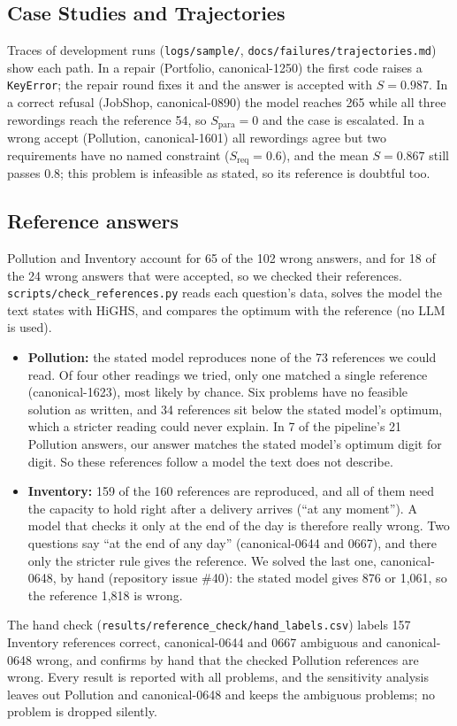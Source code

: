 \documentclass[conference]{IEEEtran}
\begin{document}
\subsection{Case Studies and Trajectories}
\label{sec:case_studies}
Traces of development runs (\texttt{logs/sample/}, \texttt{docs/failures/trajectories.md}) show each path. In a
repair (Portfolio, canonical-1250) the first code raises a \texttt{KeyError}; the repair round fixes it and the
answer is accepted with $S = 0.987$. In a correct refusal (JobShop, canonical-0890) the model reaches 265 while all
three rewordings reach the reference 54, so $S_{\text{para}} = 0$ and the case is escalated. In a wrong accept
(Pollution, canonical-1601) all rewordings agree but two requirements have no named constraint ($S_{\text{req}} =
0.6$), and the mean $S = 0.867$ still passes 0.8; this problem is infeasible as stated, so its reference is doubtful
too.

\subsection{Reference answers}
\label{sec:references}
Pollution and Inventory account for 65 of the 102 wrong answers, and for 18 of the 24 wrong answers that were
accepted, so we checked their references. \texttt{scripts/check\_references.py} reads each question's data,
solves the model the text states with HiGHS, and compares the optimum with the reference (no LLM is used).
\begin{itemize}
\item \textbf{Pollution:} the stated model reproduces none of the 73 references we could read. Of four
other readings we tried, only one matched a single reference (canonical-1623), most likely by chance.
Six problems have no feasible solution as written, and 34 references sit below the stated model's optimum, which a
stricter reading could never explain. In 7 of the pipeline's 21 Pollution answers, our answer matches the stated
model's optimum digit for digit. So these references follow a model the text does not describe.
\item \textbf{Inventory:} 159 of the 160 references are reproduced, and all of them need the capacity to hold right
after a delivery arrives (``at any moment''). A model that checks it only at the end of the day is therefore really
wrong. Two questions say ``at the end of any day'' (canonical-0644 and 0667), and there only the stricter rule gives
the reference. We solved the last one, canonical-0648, by hand (repository issue \#40): the stated model gives 876 or
1,061, so the reference 1,818 is wrong.
\end{itemize}
The hand check (\nolinkurl{results/reference_check/hand_labels.csv}) labels 157 Inventory references correct,
canonical-0644 and 0667 ambiguous and canonical-0648 wrong, and confirms by hand that the checked Pollution
references are wrong. Every result is reported with all problems, and the sensitivity
analysis leaves out Pollution and canonical-0648 and keeps the ambiguous problems; no problem is dropped silently.
\end{document}
